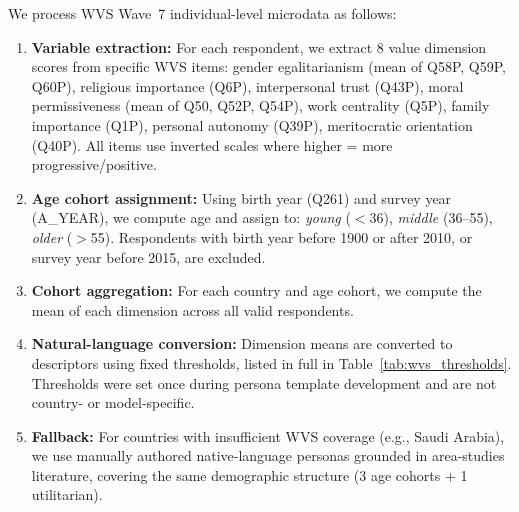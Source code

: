 \documentclass{article}
\begin{document}
We process WVS Wave~7 individual-level microdata as follows:
\begin{enumerate}
  \item \textbf{Variable extraction:} For each respondent, we extract 8 value
    dimension scores from specific WVS items: gender egalitarianism (mean of
    Q58P, Q59P, Q60P), religious importance (Q6P), interpersonal trust (Q43P),
    moral permissiveness (mean of Q50, Q52P, Q54P), work centrality (Q5P),
    family importance (Q1P), personal autonomy (Q39P), meritocratic orientation
    (Q40P). All items use inverted scales where higher = more
    progressive/positive.
  \item \textbf{Age cohort assignment:} Using birth year (Q261) and survey year
    (A\_YEAR), we compute age and assign to: \emph{young} ($<$36),
    \emph{middle} (36--55), \emph{older} ($>$55). Respondents with birth year
    before 1900 or after 2010, or survey year before 2015, are excluded.
  \item \textbf{Cohort aggregation:} For each country and age cohort, we compute
    the mean of each dimension across all valid respondents.
  \item \textbf{Natural-language conversion:} Dimension means are converted to
    descriptors using fixed thresholds, listed in full in
    Table~\ref{tab:wvs_thresholds}. Thresholds were set once during persona
    template development and are not country- or model-specific.
  \item \textbf{Fallback:} For countries with insufficient WVS coverage (e.g.,
    Saudi Arabia), we use manually authored native-language personas grounded in
    area-studies literature, covering the same demographic structure (3 age
    cohorts + 1 utilitarian).
\end{enumerate}
\end{document}
